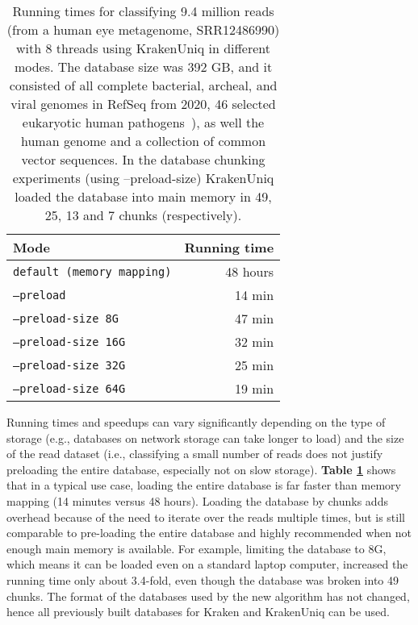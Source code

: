 \documentclass{article}
\def\code#1{\texttt{#1}}
\begin{document}
\begin{table}[h]
    \centering
    \def\arraystretch{1.3}
    \begin{tabular}{l|r}
        \textbf{Mode} & \textbf{Running time} \\
        \hline
        \hline
        \code{default (memory mapping)} & 48 hours \\
        \code{--preload} & 14 min \\
        \hline
        \code{--preload-size 8G} & 47 min \\
        \code{--preload-size 16G} & 32 min \\
        \code{--preload-size 32G} & 25 min \\
        \code{--preload-size 64G} & 19 min \\
    \end{tabular}
    \caption{Running times for classifying 9.4 million reads (from a human eye metagenome, SRR12486990) with 8 threads using KrakenUniq in different modes. The database size was 392 GB, and it consisted of all complete bacterial, archeal, and viral genomes in RefSeq from 2020, 46 selected eukaryotic human pathogens~\cite{lu2018removing}), as well the human genome and a collection of common vector sequences. In the database chunking experiments (using --preload-size) KrakenUniq loaded the database into main memory in 49, 25, 13 and 7 chunks (respectively).}
    \label{fig:speed}
\end{table}

Running times and speedups can vary significantly depending on the type of storage (e.g., databases on network storage can take longer to load) and the size of the read dataset (i.e., classifying a small number of reads does not justify preloading the entire database, especially not on slow storage). \textbf{Table \ref{fig:speed}} shows that in a typical use case, loading the entire database is far faster than memory mapping (14 minutes versus 48 hours). Loading the database by chunks adds overhead because of the need to iterate over the reads multiple times, but is still comparable to pre-loading the entire database and highly recommended when not enough main memory is available. For example, limiting the database to 8G, which means it can be loaded even on a standard laptop computer, increased the running time only about 3.4-fold, even though the database was broken into 49 chunks. The format of the databases used by the new algorithm has not changed, hence all previously built databases for Kraken and KrakenUniq can be used.
\end{document}
